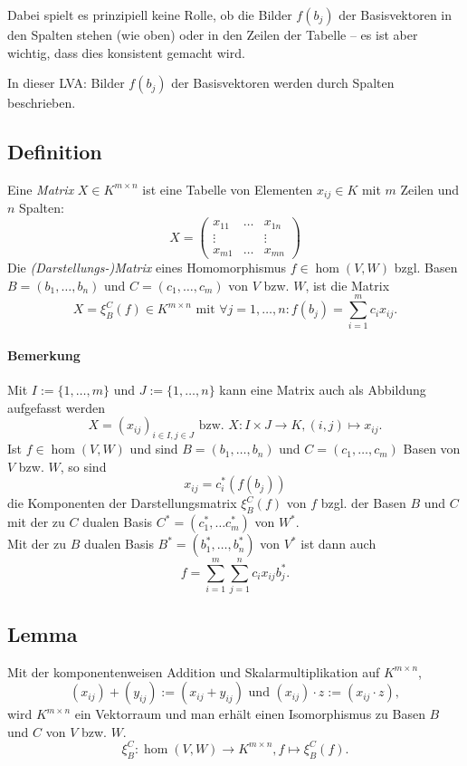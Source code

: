 	Dabei spielt es prinzipiell keine Rolle, ob die Bilder $ f(b_j) $ der Basisvektoren in den Spalten stehen (wie oben) oder in den Zeilen der Tabelle -- es ist aber wichtig, dass dies konsistent gemacht wird.
	
	In dieser LVA: Bilder $ f(b_j) $ der Basisvektoren werden durch Spalten beschrieben.

\subsection{Definition}
	\begin{Definition}[Matrix]
		Eine \emph{Matrix} $ X\in K^{m\times n} $ ist eine Tabelle von Elementen $ x_{ij}\in K $ mit $ m $ Zeilen und $ n $ Spalten:
			\[ X = \begin{pmatrix}
			x_{11} 		& \dots 	& x_{1n}\\
			\vdots 		& 			& \vdots\\
			x_{m1} 		& \dots		& x_{mn}
			\end{pmatrix} \]
		Die \emph{(Darstellungs-)Matrix} eines Homomorphismus $ f\in \hom(V,W) $ bzgl. Basen $ B= (b_1,\dots,b_n) $ und $ C=(c_1,\dots,c_m) $ von $ V $ bzw. $ W $, ist die Matrix
			\[ X = \xi^C_B(f)\in K^{m\times n}\text{ mit }\forall j=1,\dots,n:f(b_j) = \sum_{i=1}^{m}c_ix_{ij}. \]
	\end{Definition}
	
\paragraph{Bemerkung}
	Mit $ I:= \{1,\dots,m\} $ und $ J:= \{1,\dots,n\} $ kann eine Matrix auch als Abbildung aufgefasst werden
		\[ X = (x_{ij})_{i\in I,j\in J}\text{ bzw. }X:I\times J\to K,(i,j)\mapsto x_{ij}. \]
	Ist $ f\in \hom(V,W) $ und sind $ B=(b_1,\dots,b_n) $ und $ C=(c_1,\dots,c_m) $ Basen von $ V $ bzw. $ W $, so sind
		\[ x_{ij} = c_i^*(f(b_j)) \]
	die Komponenten der Darstellungsmatrix $ \xi_B^C(f) $ von $ f $ bzgl. der Basen $ B $ und $ C $ mit der zu $ C $ dualen Basis $ C^*=(c_1^*,\dots c_m^*) $ von $ W^* $.\\
	Mit der zu $ B $ dualen Basis $ B^*= (b_1^*,\dots,b_n^*) $ von $ V^* $ ist dann auch
		\[ f=\sum_{i=1}^{m}\sum_{j=1}^{n} c_ix_{ij}b_j^*. \]
\subsection{Lemma}
	\begin{Lemma}
	Mit der komponentenweisen Addition und Skalarmultiplikation auf $ K^{m\times n} $,
		\[ (x_{ij})+(y_{ij}) := (x_{ij}+y_{ij}) \text{ und } (x_{ij})\cdot z := (x_{ij}\cdot z), \]
	wird $ K^{m\times n} $ ein Vektorraum und man erhält einen Isomorphismus zu Basen $B$ und $C$ von $V$ bzw. $W$.
		\[ \xi_B^C:\hom(V,W)\to K^{m\times n},f\mapsto \xi_B^C(f). \]
	\end{Lemma}
